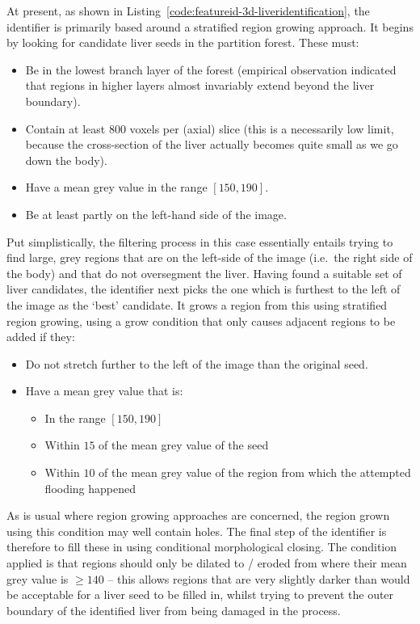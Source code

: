 At present, as shown in Listing~\ref{code:featureid-3d-liveridentification}, the identifier is primarily based around a stratified region growing approach. It begins by looking for candidate liver seeds in the partition forest. These must:
%
\begin{itemize}
\item Be in the lowest branch layer of the forest (empirical observation indicated that regions in higher layers almost invariably extend beyond the liver boundary).
\item Contain at least $800$ voxels per (axial) slice (this is a necessarily low limit, because the cross-section of the liver actually becomes quite small as we go down the body).
\item Have a mean grey value in the range $[150,190]$.
\item Be at least partly on the left-hand side of the image.
\end{itemize}
%
Put simplistically, the filtering process in this case essentially entails trying to find large, grey regions that are on the left-side of the image (i.e.~the right side of the body) and that do not oversegment the liver. Having found a suitable set of liver candidates, the identifier next picks the one which is furthest to the left of the image as the `best' candidate. It grows a region from this using stratified region growing, using a grow condition that only causes adjacent regions to be added if they:
%
\begin{itemize}
\item Do not stretch further to the left of the image than the original seed.
\item Have a mean grey value that is:

\begin{itemize}
\item In the range $[150,190]$
\item Within $15$ of the mean grey value of the seed
\item Within $10$ of the mean grey value of the region from which the attempted flooding happened
\end{itemize}

\end{itemize}
%
As is usual where region growing approaches are concerned, the region grown using this condition may well contain holes. The final step of the identifier is therefore to fill these in using conditional morphological closing. The condition applied is that regions should only be dilated to / eroded from where their mean grey value is $\ge 140$ -- this allows regions that are very slightly darker than would be acceptable for a liver seed to be filled in, whilst trying to prevent the outer boundary of the identified liver from being damaged in the process.


